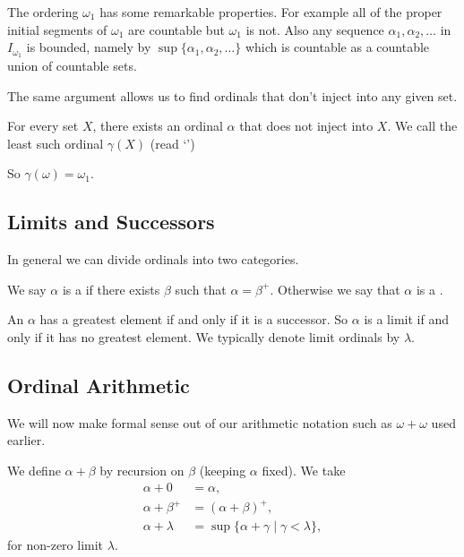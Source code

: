 \documentclass[a4paper, 10pt, twocolumn]{amsart}
\begin{document}
The ordering $\omega_1$ has some remarkable properties. For example all of the proper initial segments of $\omega_1$ are countable but $\omega_1$ is not. Also any sequence $\alpha_1, \alpha_2, \dots$ in $I_{\omega_1}$ is bounded, namely by $\sup\{\alpha_1, \alpha_2, \dots\}$ which is countable as a countable union of countable sets.

The same argument allows us to find ordinals that don't inject into any given set.
\begin{theorem}
  For every set $X$, there exists an ordinal $\alpha$ that does not inject into $X$. We call the least such ordinal $\gamma(X)$ (read `')
\end{theorem}

So $\gamma(\omega) = \omega_1$.


\subsection{Limits and Successors}
In general we can divide ordinals into two categories.

\begin{definition}
  We say $\alpha$ is a  if there exists $\beta$ such that $\alpha = \beta^+$. Otherwise we say that $\alpha$ is a .
\end{definition}

An $\alpha$ has a greatest element if and only if it is a successor. So $\alpha$ is a limit if and only if it has no greatest element. We typically denote limit ordinals by $\lambda$. 

\subsection{Ordinal Arithmetic}

We will now make formal sense out of our arithmetic notation such as $\omega + \omega$ used earlier.

\begin{definition}
We define $\alpha + \beta$ by recursion on $\beta$ (keeping $\alpha$ fixed).
We take
\begin{align*}
  \alpha + 0 &= \alpha,\\
  \alpha + \beta^+ &= (\alpha + \beta)^+,\\
  \alpha + \lambda &= \sup\{\alpha + \gamma \mid \gamma < \lambda\},
\end{align*}
for non-zero limit $\lambda$.
\end{definition}
\end{document}
